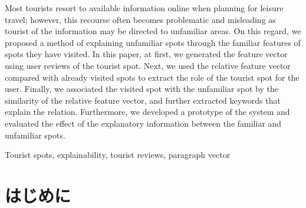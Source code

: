 \documentclass[submit]{ipsj}
\begin{document}
\begin{eabstract}
Most tourists resort to available information online when planning for leisure travel; however, this recourse often becomes problematic and misleading as tourist of the information may be directed to unfamiliar areas.
On this regard, we proposed a method of explaining unfamiliar spots through the familiar features of spots they have visited.
In this paper, at first, we generated the feature vector using user reviews of the tourist spot.
Next, we used the relative feature vector compared with already visited spots to extract the role of the tourist spot for the user.
Finally, we associated the visited spot with the unfamiliar spot by the similarity of the relative feature vector, and further extracted keywords that explain the relation.
Furthermore, we developed a prototype of the system and evaluated the effect of the explanatory information between the familiar and unfamiliar spots.
\end{eabstract}

\begin{ekeyword}
Tourist spots, explainability, tourist reviews, paragraph vector
\end{ekeyword}

\maketitle

\section{はじめに}
\end{document}
